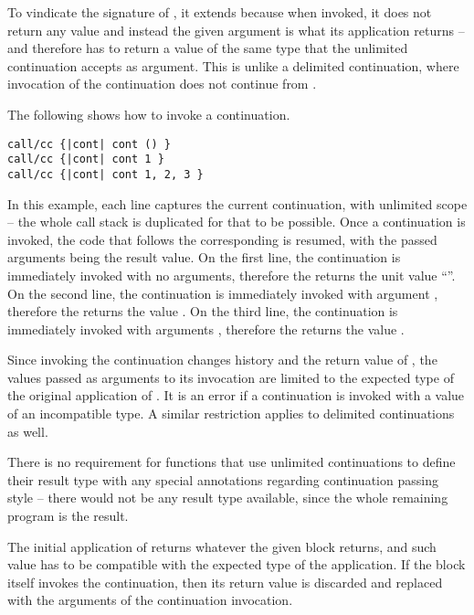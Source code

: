 To vindicate the signature of , it extends  because when invoked, it does not return any value and instead the given argument is what its  application returns -- and therefore  has to return a value of the same type that the unlimited continuation accepts as argument. This is unlike a delimited continuation, where invocation of the continuation does not continue from . 

\example The following shows how to invoke a continuation. 
\begin{lstlisting}
call/cc {|cont| cont () }
call/cc {|cont| cont 1 }
call/cc {|cont| cont 1, 2, 3 }
\end{lstlisting}
In this example, each line captures the current continuation, with unlimited scope -- the whole call stack is duplicated for that to be possible. Once a continuation is invoked, the code that follows the corresponding  is resumed, with the passed arguments being the result value. On the first line, the continuation is immediately invoked with no arguments, therefore the  returns the unit value ``\code{()}''. On the second line, the continuation is immediately invoked with argument , therefore the  returns the value . On the third line, the continuation is immediately invoked with arguments , therefore the  returns the value . 

Since invoking the continuation changes history and the return value of , the values passed as arguments to its invocation are limited to the expected type of the original application of . It is an error if a continuation is invoked with a value of an incompatible type. A similar restriction applies to delimited continuations as well. 

There is no requirement for functions that use unlimited continuations to define their result type with any special annotations regarding continuation passing style -- there would not be any result type available, since the whole remaining program is the result. 

The initial application of  returns whatever the given block returns, and such value has to be compatible with the expected type of the  application. If the block itself invokes the continuation, then its return value is discarded and replaced with the arguments of the continuation invocation. 







